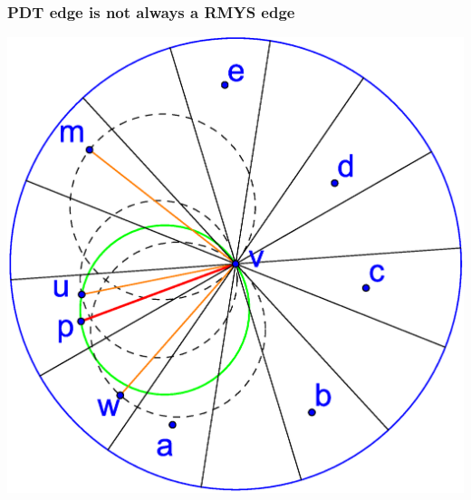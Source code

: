 \documentclass[compress]{beamer}
\begin{document}
\begin{frame}
	\frametitle{PDT edge is not always a RMYS edge}
	\center \includegraphics[width=0.7\linewidth]{RMYS_case_one_cone_empty.eps}
\end{frame}
\end{document}
